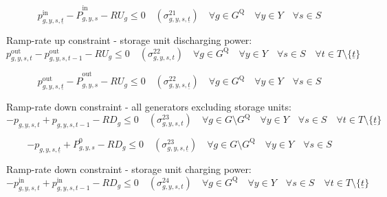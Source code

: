 \documentclass{article}
\newcommand{\sGenerators}{G}
\newcommand{\sStorage}{G^{\mathrm{Q}}}
\newcommand{\sYears}{Y}
\newcommand{\sScenarios}{S}
\newcommand{\sIntervals}{T}
\newcommand{\iGenerator}{g}
\newcommand{\iYear}{y}
\newcommand{\iScenario}{s}
\newcommand{\iInterval}{t}
\newcommand{\iIntervalStart}{\underline{\iInterval}}
\newcommand{\cRampRateUp}[1][\iGenerator]{RU_{#1}}
\newcommand{\cRampRateDown}[1][\iGenerator]{RD_{#1}}
\newcommand{\cPowerInitial}[1][\iGenerator,\iYear,\iScenario]{P_{#1}^{0}}
\newcommand{\cPowerOutInitial}[1][\iGenerator,\iYear,\iScenario]{\hat{P}_{#1}^{\mathrm{out}}}
\newcommand{\cPowerInInitial}[1][\iGenerator,\iYear,\iScenario]{\hat{P}_{#1}^{\mathrm{in}}}
\newcommand{\vPower}[1][\iGenerator,\iYear,\iScenario,\iInterval]{p_{#1}}
\newcommand{\vPowerIn}[1][\iGenerator,\iYear,\iScenario,\iInterval]{p^{\mathrm{in}}_{#1}}
\newcommand{\vPowerOut}[1][\iGenerator,\iYear,\iScenario,\iInterval]{p^{\mathrm{out}}_{#1}}
\newcommand{\dRampRateUpStorageCharging}[1][\iGenerator,\iYear,\iScenario,\iInterval]{\sigma_{#1}^{21}}
\newcommand{\dRampRateUpStorageDischarging}[1][\iGenerator,\iYear,\iScenario,\iInterval]{\sigma_{#1}^{22}}
\newcommand{\dRampRateDown}[1][\iGenerator,\iYear,\iScenario,\iInterval]{\sigma_{#1}^{23}}
\newcommand{\dRampRateDownStorageCharging}[1][\iGenerator,\iYear,\iScenario,\iInterval]{\sigma_{#1}^{24}}
\begin{document}
\begin{equation}
\vPowerIn[\iGenerator,\iYear,\iScenario,\iIntervalStart] - \cPowerInInitial - \cRampRateUp \leq 0 \quad (\dRampRateUpStorageCharging[\iGenerator,\iYear,\iScenario,\iIntervalStart]) \quad \forall \iGenerator \in \sStorage \quad \forall \iYear \in \sYears \quad \forall \iScenario \in \sScenarios
\end{equation}

Ramp-rate up constraint - storage unit discharging power:
\begin{equation}
\vPowerOut - \vPowerOut[\iGenerator,\iYear,\iScenario,\iInterval-1] - \cRampRateUp \leq 0 \quad (\dRampRateUpStorageDischarging) \quad \forall \iGenerator \in \sStorage \quad \forall \iYear \in \sYears \quad \forall \iScenario \in \sScenarios \quad \forall \iInterval \in \sIntervals \setminus \{\iIntervalStart\}
\end{equation}

\begin{equation}
\vPowerOut[\iGenerator,\iYear,\iScenario,\iIntervalStart] - \cPowerOutInitial - \cRampRateUp \leq 0 \quad (\dRampRateUpStorageDischarging[\iGenerator,\iYear,\iScenario,\iIntervalStart]) \quad \forall \iGenerator \in \sStorage \quad \forall \iYear \in \sYears \quad \forall \iScenario \in \sScenarios
\end{equation}

Ramp-rate down constraint - all generators excluding storage units:
\begin{equation}
	- \vPower + \vPower[\iGenerator,\iYear,\iScenario,\iInterval-1] - \cRampRateDown \leq 0 \quad (\dRampRateDown) \quad \forall \iGenerator \in \sGenerators \setminus \sStorage \quad \forall \iYear \in \sYears \quad \forall \iScenario \in \sScenarios \quad \forall \iInterval \in \sIntervals \setminus \{\iIntervalStart\}
\end{equation}

\begin{equation}
- \vPower[\iGenerator,\iYear,\iScenario,\iIntervalStart] + \cPowerInitial - \cRampRateDown \leq 0 \quad (\dRampRateDown[\iGenerator,\iYear,\iScenario,\iIntervalStart]) \quad \forall \iGenerator \in \sGenerators\setminus \sStorage \quad \forall \iYear \in \sYears \quad \forall \iScenario \in \sScenarios
\end{equation}

Ramp-rate down constraint - storage unit charging power:
\begin{equation}
-\vPowerIn + \vPowerIn[\iGenerator,\iYear,\iScenario,\iInterval-1] - \cRampRateDown \leq 0 \quad (\dRampRateDownStorageCharging) \quad \forall \iGenerator \in \sStorage \quad \forall \iYear \in \sYears \quad \forall \iScenario \in \sScenarios \quad \forall \iInterval \in \sIntervals \setminus \{\iIntervalStart\}
\end{equation}
\end{document}
